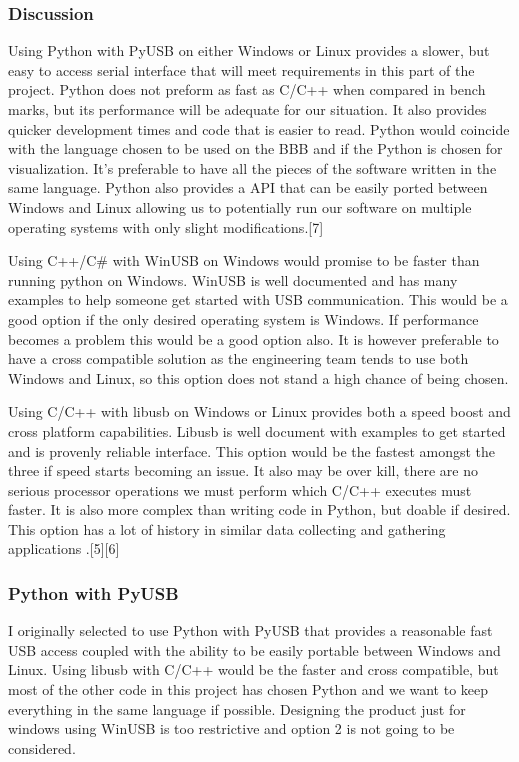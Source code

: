 \documentclass[10pt,draftclsnofoot,onecolumn]{IEEEtran}
\begin{document}
\subsubsection{Discussion}
Using Python with PyUSB on either Windows or Linux provides a slower, but easy to access serial interface that will meet requirements in this part of the project. Python does not preform as fast as C/C++ when compared in bench marks, but its performance will be adequate for our situation. It also provides quicker development times and code that is easier to read. Python would coincide with the language chosen to be used on the BBB and if the Python is chosen for visualization. It’s preferable to have all the pieces of the software written in the same language. Python also provides a API that can be easily ported between Windows and Linux allowing us to potentially run our software on multiple operating systems with only slight modifications.[7] \par
Using C++/C\# with WinUSB on Windows would promise to be faster than running python on Windows. WinUSB is well documented and has many examples to help someone get started with USB communication. This would be a good option if the only desired operating system is Windows.  If performance becomes a problem this would be a good option also. It is however preferable to have a cross compatible solution as the engineering team tends to use both Windows and Linux, so this option does not stand a high chance of being chosen. \par
Using C/C++ with libusb on Windows or Linux provides both a speed boost and cross platform capabilities.  Libusb is well document with examples to get started and is provenly reliable interface. This option would be the fastest amongst the three if speed starts becoming an issue. It also may be over kill, there are no serious processor operations we must perform which C/C++ executes must faster. It is also more complex than writing code in Python, but doable if desired. This option has a lot of history in similar data collecting and gathering applications .[5][6] \\

\subsubsection{Python with PyUSB}
        I originally selected to use Python with PyUSB that provides a reasonable fast USB access coupled with the ability to be easily portable between Windows and Linux. Using libusb with C/C++ would be the faster and cross compatible, but most of the other code in this project has chosen Python and we want to keep everything in the same language if possible. Designing the product just for windows using WinUSB is too restrictive and option 2 is not going to be considered.
\end{document}
